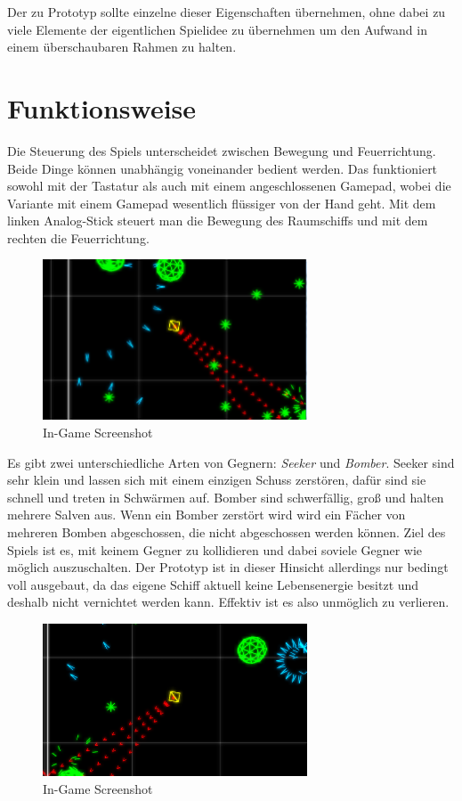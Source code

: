 \documentclass[a4paper]{article}
\begin{document}
Der zu Prototyp sollte einzelne dieser Eigenschaften übernehmen, ohne dabei zu viele Elemente der eigentlichen Spielidee zu übernehmen um den Aufwand in einem überschaubaren Rahmen zu halten.

\newpage
\section{Funktionsweise}
Die Steuerung des Spiels unterscheidet zwischen Bewegung und Feuerrichtung. Beide Dinge können unabhängig voneinander bedient werden. Das funktioniert sowohl mit der Tastatur als auch mit einem angeschlossenen Gamepad, wobei die Variante mit einem Gamepad wesentlich flüssiger von der Hand geht. Mit dem linken Analog-Stick steuert man die Bewegung des Raumschiffs und mit dem rechten die Feuerrichtung. 

\begin{figure}[H]
\centering
\includegraphics[width=0.7\textwidth]{screenshot1_crop.png}
\caption{In-Game Screenshot}
\end{figure}

Es gibt zwei unterschiedliche Arten von Gegnern: \textit{Seeker} und \textit{Bomber}. Seeker sind sehr klein und lassen sich mit einem einzigen Schuss zerstören, dafür sind sie schnell und treten in Schwärmen auf. Bomber sind schwerfällig, groß und halten mehrere Salven aus. Wenn ein Bomber zerstört wird wird ein Fächer von mehreren Bomben abgeschossen, die nicht abgeschossen werden können. Ziel des Spiels ist es, mit keinem Gegner zu kollidieren und dabei soviele Gegner wie möglich auszuschalten. Der Prototyp ist in dieser Hinsicht allerdings nur bedingt voll ausgebaut, da das eigene Schiff aktuell keine Lebensenergie besitzt und deshalb nicht vernichtet werden kann. Effektiv ist es also unmöglich zu verlieren.

\begin{figure}[H]
\centering
\includegraphics[width=0.7\textwidth]{screenshot2_crop.png}
\caption{In-Game Screenshot}
\end{figure}
\end{document}

